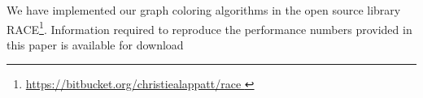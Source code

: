 \begin{itemize}
\end{itemize}
We have implemented our graph coloring algorithms in the open source library \acrfull{RACE}\footnote{\href{https://bitbucket.org/christiealappatt/race}{https://bitbucket.org/christiealappatt/race }}. {\GW Information required to reproduce the performance numbers provided in this paper is available for download} 


